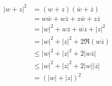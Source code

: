 {\begin{enumerate}[label=(\roman*)]
{			      \begin{align*}
				      \left\lvert w + z \right\rvert^{2} & = (w + z)(\overline{w} + \overline{z})                                                                                                     \\
				                                         & = w\overline{w} + w\overline{z} + z\overline{w} + z\overline{z}                                                                            \\
				                                         & = \left\lvert w \right\rvert^{2} + w\overline{z} + \overline{\overline{w}z} + \left\lvert z \right\rvert^{2}                               \\
				                                         & = \left\lvert w \right\rvert^{2} +  \left\lvert z \right\rvert^{2} + 2 \Re(w\overline{z})                                                  \\
				                                         & \leq \left\lvert w \right\rvert^{2} +  \left\lvert z \right\rvert^{2} + 2 \left\lvert w\overline{z} \right\rvert                           \\
				                                         & \leq \left\lvert w \right\rvert^{2} +  \left\lvert z \right\rvert^{2} + 2 \left\lvert w \right\rvert \left\lvert \overline{z} \right\rvert \\
				                                         & = \left(\left\lvert w \right\rvert + \left\lvert z \right\rvert\right)^{2}                                                                 \\
			      \end{align*}

		      }

	\end{enumerate}
}

